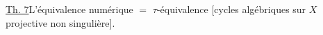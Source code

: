 \uline{Th. 7}\qquad L'équivalence numérique $=$ $\tau$-équivalence \deleted{(}[cycles algébriques sur $X$ projective non singulière\deleted{)}].
